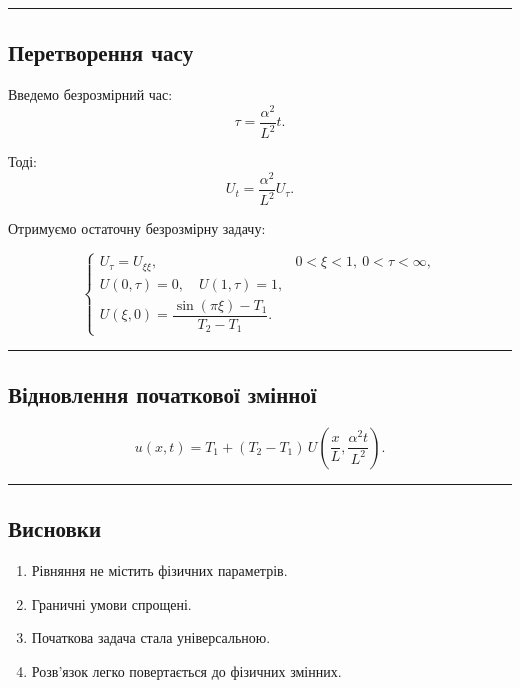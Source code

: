 \documentclass[
  ukrainian,
]{article}
\providecommand{\tightlist}{%
  \setlength{\itemsep}{0pt}\setlength{\parskip}{0pt}}
\begin{document}
\begin{center}\rule{0.5\linewidth}{0.5pt}\end{center}

\subsection{Перетворення
часу}\label{ux43fux435ux440ux435ux442ux432ux43eux440ux435ux43dux43dux44f-ux447ux430ux441ux443}

Введемо безрозмірний час: \[
\tau = \frac{\alpha^2}{L^2} t.
\]

Тоді: \[
U_t = \frac{\alpha^2}{L^2} U_\tau.
\]

Отримуємо остаточну безрозмірну задачу:

\[
\begin{cases}
U_\tau = U_{\xi\xi}, & 0 < \xi < 1,\ 0 < \tau < \infty, \\
U(0,\tau)=0,\quad U(1,\tau)=1, \\
U(\xi,0)=\dfrac{\sin(\pi \xi)-T_1}{T_2-T_1}.
\end{cases}
\]

\begin{center}\rule{0.5\linewidth}{0.5pt}\end{center}

\subsection{Відновлення початкової
змінної}\label{ux432ux456ux434ux43dux43eux432ux43bux435ux43dux43dux44f-ux43fux43eux447ux430ux442ux43aux43eux432ux43eux457-ux437ux43cux456ux43dux43dux43eux457}

\[
u(x,t) = T_1 + (T_2 - T_1)\, U\!\left(\frac{x}{L}, \frac{\alpha^2 t}{L^2}\right).
\]

\begin{center}\rule{0.5\linewidth}{0.5pt}\end{center}

\subsection{Висновки}\label{ux432ux438ux441ux43dux43eux432ux43aux438}

\begin{enumerate}
\def\labelenumi{\arabic{enumi}.}
\tightlist
\item
  Рівняння не містить фізичних параметрів.
\item
  Граничні умови спрощені.
\item
  Початкова задача стала універсальною.
\item
  Розв'язок легко повертається до фізичних змінних.
\end{enumerate}
\end{document}

